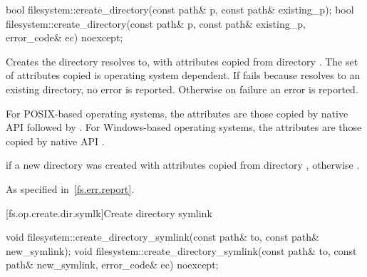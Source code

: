 %
\begin{itemdecl}
bool filesystem::create_directory(const path& p, const path& existing_p);
bool filesystem::create_directory(const path& p, const path& existing_p, error_code& ec) noexcept;
\end{itemdecl}

\begin{itemdescr}
\pnum
\effects
Creates the
  directory  resolves to, with
  attributes copied from directory . The set of attributes
  copied is operating system dependent.
  If  fails because  resolves to an existing directory,
  no error is reported. Otherwise on failure an error is reported.
\begin{note}
For POSIX-based operating systems, the
      attributes are those copied by native API 
      followed by . For
      Windows-based operating systems, the attributes are those copied by native
      API .
\end{note}

\pnum
\returns
{} if a new directory was created
  with attributes copied from directory ,
  otherwise .

\pnum
\throws
As specified in~\ref{fs.err.report}.
\end{itemdescr}


[fs.op.create.dir.symlk]{Create directory symlink}

%
\begin{itemdecl}
void filesystem::create_directory_symlink(const path& to, const path& new_symlink);
void filesystem::create_directory_symlink(const path& to, const path& new_symlink,
                              error_code& ec) noexcept;
\end{itemdecl}


